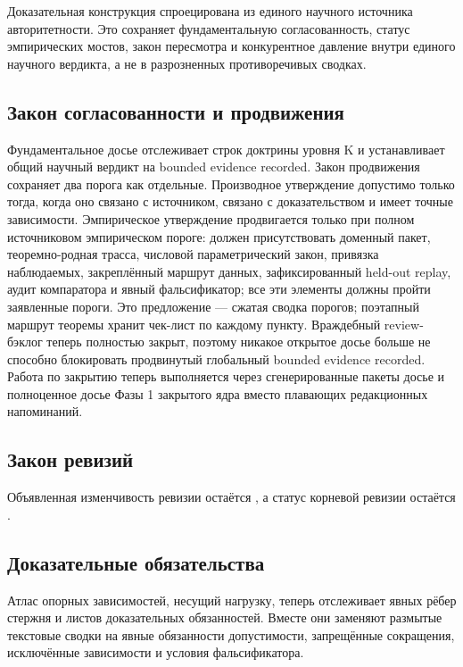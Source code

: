 Доказательная конструкция спроецирована из единого научного источника авторитетности. Это сохраняет фундаментальную согласованность, статус эмпирических мостов, закон пересмотра и конкурентное давление внутри единого научного вердикта, а не в разрозненных противоречивых сводках.

\subsection{Закон согласованности и продвижения}
Фундаментальное досье отслеживает  строк доктрины уровня K и устанавливает общий научный вердикт на bounded evidence recorded.
Закон продвижения сохраняет два порога как отдельные. Производное утверждение допустимо только тогда, когда оно связано с источником, связано с доказательством и имеет точные зависимости. Эмпирическое утверждение продвигается только при полном источниковом эмпирическом пороге: должен присутствовать доменный пакет, теоремно-родная трасса, числовой параметрический закон, привязка наблюдаемых, закреплённый маршрут данных, зафиксированный held-out replay, аудит компаратора и явный фальсификатор; все эти элементы должны пройти заявленные пороги. Это предложение — сжатая сводка порогов; поэтапный маршрут теоремы хранит чек-лист по каждому пункту.
Враждебный review-бэклог теперь полностью закрыт, поэтому никакое открытое досье больше не способно блокировать продвинутый глобальный bounded evidence recorded.
Работа по закрытию теперь выполняется через сгенерированные пакеты досье и полноценное досье Фазы 1 закрытого ядра вместо плавающих редакционных напоминаний.

\subsection{Закон ревизий}
Объявленная изменчивость ревизии остаётся , а статус корневой ревизии остаётся .

\subsection{Доказательные обязательства}
Атлас опорных зависимостей, несущий нагрузку, теперь отслеживает  явных рёбер стержня и  листов доказательных обязанностей. Вместе они заменяют размытые текстовые сводки на явные обязанности допустимости, запрещённые сокращения, исключённые зависимости и условия фальсификатора.

